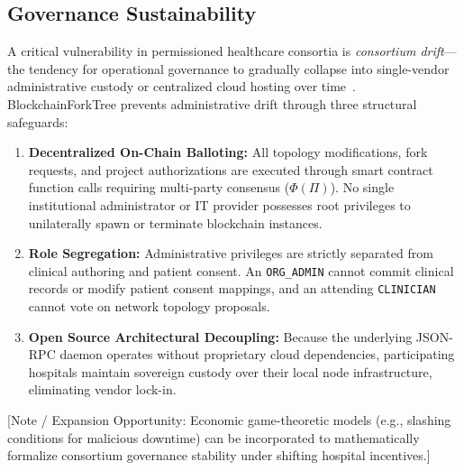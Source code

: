 \subsection{Governance Sustainability}
A critical vulnerability in permissioned healthcare consortia is \textit{consortium drift}—the tendency for operational governance to gradually collapse into single-vendor administrative custody or centralized cloud hosting over time~\cite{esposito2018blockchain}. BlockchainForkTree prevents administrative drift through three structural safeguards:
\begin{enumerate}
    \item \textbf{Decentralized On-Chain Balloting:} All topology modifications, fork requests, and project authorizations are executed through smart contract function calls requiring multi-party consensus ($\Phi(\Pi)$). No single institutional administrator or IT provider possesses root privileges to unilaterally spawn or terminate blockchain instances.
    \item \textbf{Role Segregation:} Administrative privileges are strictly separated from clinical authoring and patient consent. An \texttt{ORG\_ADMIN} cannot commit clinical records or modify patient consent mappings, and an attending \texttt{CLINICIAN} cannot vote on network topology proposals.
    \item \textbf{Open Source Architectural Decoupling:} Because the underlying JSON-RPC daemon operates without proprietary cloud dependencies, participating hospitals maintain sovereign custody over their local node infrastructure, eliminating vendor lock-in.
\end{enumerate}

[Note / Expansion Opportunity: Economic game-theoretic models (e.g., slashing conditions for malicious downtime) can be incorporated to mathematically formalize consortium governance stability under shifting hospital incentives.]
